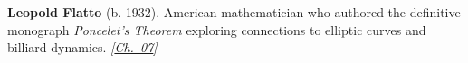 \textbf{Leopold Flatto} (b. 1932). American mathematician who authored the definitive monograph \emph{Poncelet's Theorem} exploring connections to elliptic curves and billiard dynamics. \emph{[\hyperref[ch:billiardsconicsporism]{Ch.~07}]}

